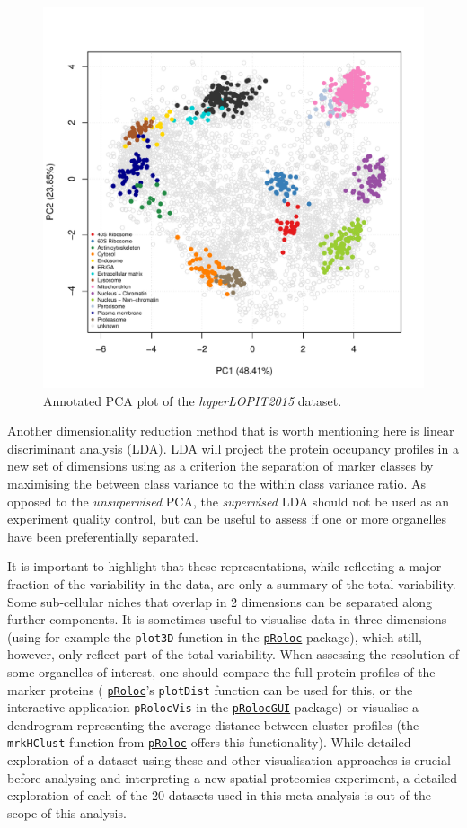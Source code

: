 \documentclass[12pt]{article}\usepackage[]{graphicx}\usepackage[]{color}
\newenvironment{knitrout}{}{} %
\newcommand{\Rpackage}[1]{\texttt{#1}}
\newcommand\Biocpkg[1]{%
  {\href{http://bioconductor.org/packages/#1}%
    {\Rpackage{#1}}}}
\begin{document}
\begin{figure}[ht]
  \centering
\begin{knitrout}
\color{fgcolor}
\includegraphics[width=0.75\linewidth]{figure/pcahl-1} 

\end{knitrout}
  \caption{Annotated PCA plot of the \textit{hyperLOPIT2015} dataset.}
  \label{fig:pcahl}
\end{figure}

Another dimensionality reduction method that is worth mentioning here
is linear discriminant analysis (LDA). LDA will project the protein
occupancy profiles in a new set of dimensions using as a criterion the
separation of marker classes by maximising the between class variance
to the within class variance ratio. As opposed to the
\textit{unsupervised} PCA, the \textit{supervised} LDA should not be
used as an experiment quality control, but can be useful to assess if
one or more organelles have been preferentially separated.

\bigskip

It is important to highlight that these representations, while
reflecting a major fraction of the variability in the data, are only a
summary of the total variability. Some sub-cellular niches that
overlap in 2 dimensions can be separated along further components. It
is sometimes useful to visualise data in three dimensions (using for
example the \texttt{plot3D} function in the \Biocpkg{pRoloc} package),
which still, however, only reflect part of the total variability. When
assessing the resolution of some organelles of interest, one should
compare the full protein profiles of the marker proteins
(\Biocpkg{pRoloc}'s \texttt{plotDist} function can be used for this, or
the interactive application \texttt{pRolocVis} in the \Biocpkg{pRolocGUI}
package) or visualise a dendrogram representing the average distance between
cluster profiles (the \texttt{mrkHClust} function from
\Biocpkg{pRoloc} offers this functionality). While detailed
exploration of a dataset using these and other visualisation
approaches is crucial before analysing and interpreting a new spatial
proteomics experiment, a detailed exploration of each of the
20 datasets used in this meta-analysis is out of the
scope of this analysis.
\end{document}
